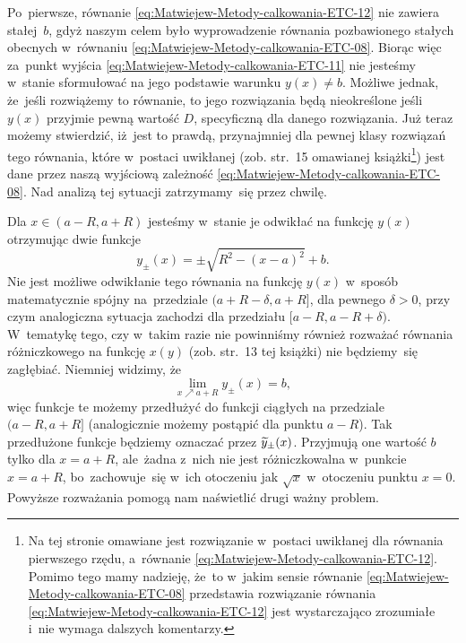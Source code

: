 \documentclass[a4paper,11pt]{article}
\begin{document}
Po~pierwsze, równanie \eqref{eq:Matwiejew-Metody-calkowania-ETC-12} nie
zawiera stałej~$b$, gdyż naszym celem było wyprowadzenie równania
pozbawionego stałych obecnych w~równaniu
\eqref{eq:Matwiejew-Metody-calkowania-ETC-08}. Biorąc więc za~punkt wyjścia
\eqref{eq:Matwiejew-Metody-calkowania-ETC-11} nie jesteśmy w~stanie
sformułować na jego podstawie warunku $y( x ) \neq b$. Możliwe jednak, że~jeśli
rozwiążemy to równanie, to jego rozwiązania będą nieokreślone jeśli $y( x )$
przyjmie pewną wartość $D$, specyficzną dla danego rozwiązania. Już teraz
możemy stwierdzić, iż~jest to prawdą, przynajmniej dla pewnej klasy
rozwiązań tego równania, które w~postaci uwikłanej (zob. str.~15 omawianej
książki\footnote{Na tej stronie omawiane jest rozwiązanie w~postaci
  uwikłanej dla równania pierwszego rzędu, a~równanie
  \eqref{eq:Matwiejew-Metody-calkowania-ETC-12}. Pomimo tego mamy nadzieję,
  że~to w~jakim sensie równanie
  \eqref{eq:Matwiejew-Metody-calkowania-ETC-08} przedstawia rozwiązanie
  równania \eqref{eq:Matwiejew-Metody-calkowania-ETC-12} jest wystarczająco
  zrozumiałe i~nie wymaga dalszych komentarzy.}) jest dane przez naszą
wyjściową zależność
\eqref{eq:Matwiejew-Metody-calkowania-ETC-08}. Nad analizą tej sytuacji
zatrzymamy~się przez chwilę.

Dla $x \in ( a - R, a + R )$ jesteśmy w~stanie je odwikłać na funkcję
$y( x )$ otrzymując dwie funkcje
\begin{equation}
  \label{eq:Matwiejew-Metody-calkowania-ETC-14}
  y_{ \pm }( x ) = \pm\sqrt{ R^{ 2 } - ( x - a )^{ 2 } } + b.
\end{equation}
Nie jest możliwe odwikłanie tego równania na funkcję $y( x )$ w~sposób
matematycznie spójny na~przedziale $( a + R - \delta, a + R ]$, dla pewnego
$\delta > 0$, przy czym analogiczna sytuacja zachodzi dla przedziału
$[ a - R, a - R + \delta )$. W~tematykę tego, czy w~takim razie nie powinniśmy
również rozważać równania różniczkowego na funkcję $x( y )$ (zob. str.~13
tej książki) nie będziemy~się zagłębiać. Niemniej widzimy, że
\begin{equation}
  \label{eq:Matwiejew-Metody-calkowania-ETC-15}
  \lim_{ x \nearrow a + R } y_{ \pm }( x ) = b,
\end{equation}
więc funkcje te możemy przedłużyć do funkcji ciągłych na przedziale
$( a - R, a + R ]$ (analogicznie możemy postąpić dla punktu $a - R$).
Tak przedłużone funkcje będziemy oznaczać przez $\widetilde{y}_{ \pm }( x )$.
Przyjmują one wartość $b$ tylko dla $x = a + R$, ale~żadna z~nich nie jest
różniczkowalna w~punkcie $x = a + R$, bo~zachowuje~się w~ich otoczeniu jak
$\sqrt{ x }$ w~otoczeniu punktu $x = 0$. Powyższe rozważania pomogą nam
naświetlić drugi ważny problem.
\end{document}

